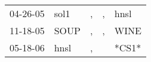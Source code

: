 \begin{supertabular}{lllll}
 04-26-05 &  sol1 &  , &  , &   hnsl \\
 11-18-05 &  SOUP &  , &  , &   WINE \\
 05-18-06 &  hnsl &  , &    &  *CS1* \\
\end{supertabular}
